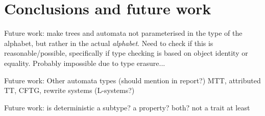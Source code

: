 \section{Conclusions and future work}


Future work: make trees and automata not parameterised in the type of the
alphabet, but rather in the actual \emph{alphabet}. Need to check if this
is reasonable/possible, specifically if type checking is based on object
identity or equality. Probably impossible due to type erasure...

Future work: Other automata types (should mention in report?) MTT,
       attributed TT, CFTG, rewrite systems (L-systems?)

Future work: is deterministic a subtype? a property? both? not a trait at
least


